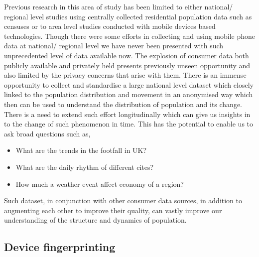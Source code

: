 
Previous research in this area of study has been limited to either national/ regional level studies using centrally collected residential population data such as censuses or to area level studies conducted with mobile devices based technologies.
Though there were some efforts in collecting and using mobile phone data at national/ regional level we have never been presented with such unprecedented level of data available now.
The explosion of consumer data both publicly available and privately held presents previously unseen opportunity and also limited by the privacy concerns that arise with them.
There is an immense opportunity to collect and standardise a large national level dataset which closely linked to the population distribution and movement in an anonymised way which then can be used to understand the distribution of population and its change.
There is a need to extend such effort  longitudinally which can give us insights in to the change of such phenomenon in time.
This has the potential to enable us to ask broad questions such as,

\begin{itemize}
  \setlength{\itemindent}{2em}
  \itemsep-0.25em
  \item What are the trends in the footfall in UK?
  \item What are the daily rhythm of different cites?
  \item How much a weather event affect economy of a region?
\end{itemize}

Such dataset, in conjunction with other consumer data sources, in addition to augmenting each other to improve their quality, can vastly improve our understanding of the structure and dynamics of population.

\subsection{Device fingerprinting}


